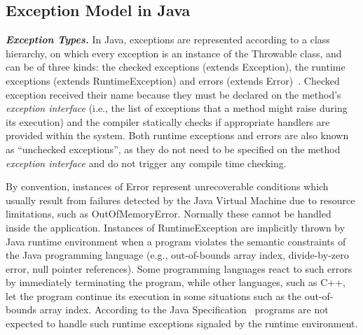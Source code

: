 \documentclass[conference]{IEEEtran}
\begin{document}



\subsection{Exception Model in Java} \label{sec:extypes}

\emph{\textbf{Exception Types.}} In Java, exceptions are represented according to a class hierarchy, on which
 every exception is an instance of the Throwable class, and can be of three kinds: the checked exceptions
(extends Exception), the runtime exceptions (extends RuntimeException) and errors
(extends Error)~\cite{gosling2000java}. Checked exception received their name
 because they must be declared on the method's \emph{exception interface} (i.e., the list of exceptions that a method 
might raise during its execution) and the compiler statically checks if
 appropriate handlers are provided within the system.
Both runtime exceptions and errors are also known as ``unchecked exceptions'', as 
they do not need to be specified on the method \emph{exception interface} and do not trigger any 
compile time checking.

By convention, instances of Error represent  unrecoverable conditions which usually result
from failures detected by the Java Virtual Machine due to resource limitations, such as OutOfMemoryError.
Normally these cannot be handled inside the application.  Instances of RuntimeException are implicitly 
thrown by Java runtime environment when a program violates 
the semantic constraints of the Java programming language (e.g., out-of-bounds array index, divide-by-zero 
error, null pointer references). Some programming languages react to such errors by immediately terminating the program, while
other languages, such as C++, let the program  continue
 its execution in some situations such as the out-of-bounds array index.
According to the Java Specification~\cite{gosling2000java} programs are not 
expected to handle such runtime exceptions signaled by the runtime environment. 
\end{document}
